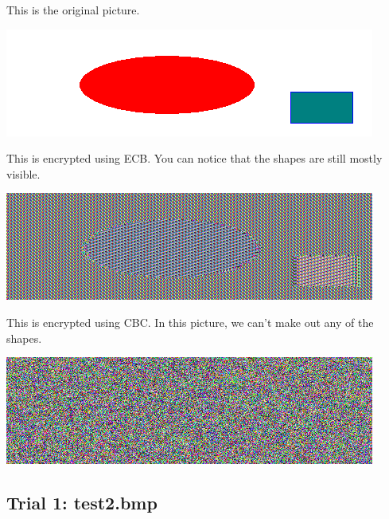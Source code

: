 \documentclass{article}
\begin{document}
This is the original picture.
\begin{center}
    \includegraphics[scale=0.5]{pic_original.png}
\end{center}
This is encrypted using ECB.  You can notice that the shapes are still mostly visible.
\begin{center}
    \includegraphics[scale=0.5]{pic_ecb1.png}
\end{center}
This is encrypted using CBC.  In this picture, we can't make out any of the shapes.
\begin{center}
    \includegraphics[scale=0.5]{pic_cbc1.png}
\end{center}

\subsection{Trial 1: test2.bmp}
\end{document}
